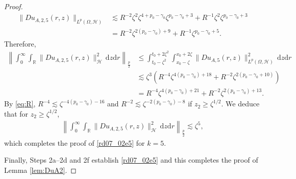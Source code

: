 \documentclass[10pt,a4paper]{amsart}
\newcommand {\deltah}{{\zeta}}
\newcommand{\R}{{\mathbb{R}}}
\renewcommand{\d}{\mathrm{d}}
\begin{document}
\begin{proof}
\begin{align*}
          \|Du_{A,2,5}(r,z)\|_{L^{p}(\Omega,\mathcal{H})} &\lesssim R^{-2} \deltah^2 \deltah^{4 + p_0 - \gamma_0} \deltah^{p_0 - \gamma_0 +3} + R^{-1} \deltah^2 \deltah^{p_0 - \gamma_0 +3}\\
           &= R^{-2}\deltah^{2(p_0-\gamma_0)+9} + R^{-1}\deltah^{p_0-\gamma_0+5}.
\end{align*}
Therefore, 
\begin{align}\nonumber
  \left\|\int_0^\infty\int_\R \|Du_{A,2,5}(r,z)\|_\mathcal{H}^2 \, \d z\d r\right\|_{\frac p2} &  \leq \int_{t_0-\deltah^2}^{t_0+2\deltah^2}\int_{x_0-\deltah}^{x_0+2\deltah} \|Du_{A,5}(r,z)\|_{L^p(\Omega, \mathcal{H})}^2 \, \d z\d r\\ \nonumber
     & \lesssim  \deltah^3 (R^{-4} \deltah^{4 (p_0 - \gamma_0) + 18} + R^{-2} \deltah^{2 (p_0 - \gamma_0 + 10)} ) \\
           &= R^{-4}\deltah^{4(p_0-\gamma_0)+21} + R^{-2}\deltah^{2(p_0-\gamma_0)+13}.
 \label{rd07_02e9}
 \end{align}
By \eqref{eq:R},  $R^{-4}\lesssim \deltah^{-4(p_0-\gamma_0)-16}$ and $R^{-2}\lesssim \deltah^{-2(p_0-\gamma_0)-8}$
           if $z_2\geq \deltah^{1/2}$. We deduce that for $z_2\geq \deltah^{1/2}$,
\begin{align} \label{rd08_06e2}
           \left\|\int_0^\infty\int_\R \|Du_{A,2,5}(r,z)\|_\mathcal{H}^2 \, \d z\d r\right\|_{\frac p2} \lesssim \deltah^{5},
\end{align}
           which completes the proof of \eqref{rd07_02e5} for $k=5$.
           
           Finally, %
  Steps 2a--2d and 2f establish \eqref{rd07_02e5} and this completes the proof of Lemma \ref{lem:DuA2}.
 \end{proof}
\end{document}
